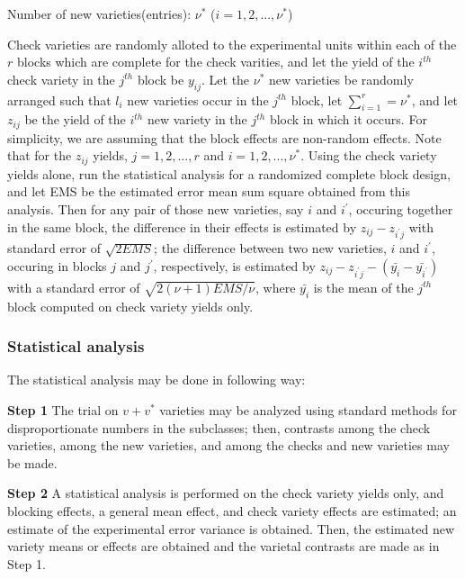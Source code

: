 \documentclass[12pt,oneside]{dukestatscithesis} %
\begin{document}
Number of new varieties(entries): \(\nu^*\) (\(i = 1, 2,..., \nu^*\))

Check varieties are randomly alloted to the experimental units within each of the \(r\) blocks which are complete for the check varities, and let the yield of the \(i^{th}\) check variety in the \(j^{th}\) block be \(y_{ij}\). Let the \(\nu^*\) new varieties be randomly arranged such that \(l_{i}\) new varieties occur in the \(j^{th}\) block, let \(\sum\limits_{i = 1}^r = \nu^*\), and let \(z_{ij}\) be the yield of the \(i^{th}\) new variety in the \(j^{th}\) block in which it occurs. For simplicity, we are assuming that the block effects are non-random effects. Note that for the \(z_{ij}\) yields, \(j = 1, 2, ..., r\) and \(i = 1, 2,..., \nu^*\). Using the check variety yields alone, run the statistical analysis for a randomized complete block design, and let EMS be the estimated error mean sum square obtained from this analysis. Then for any pair of those new varieties, say \(i\) and \(i^{\prime}\), occuring together in the same block, the difference in their effects is estimated by \(z_{ij}- z_{i^{\prime}j}\) with standard error of \(\sqrt{2EMS}\); the difference between two new varieties, \(i\) and \(i^\prime\), occuring in blocks \(j\) and \(j^\prime\), respectively, is estimated by \(z_{ij}-z_{i^{\prime}j}-(\bar{y_{i}}-\bar{y_{i^{\prime}}})\) with a standard error of \(\sqrt{2(\nu + 1)EMS/\nu}\), where \(\bar{y_{i}}\) is the mean of the \(j^{th}\) block computed on check variety yields only.

\hypertarget{stat-an-aug-block}{%
\subsubsection{Statistical analysis}\label{stat-an-aug-block}}

The statistical analysis may be done in following way:

\textbf{Step 1}
\newline The trial on \(v + v^*\) varieties may be analyzed using standard methods for disproportionate numbers in the subclasses; then, contrasts among the check varieties, among the new varieties, and among the checks and new varieties may be made.

\textbf{Step 2}
\newline A statistical analysis is performed on the check variety yields only, and blocking effects, a general mean effect, and check variety effects are estimated; an estimate of the experimental error variance is obtained. Then, the estimated new variety means or effects are obtained and the varietal contrasts are made as in Step 1.
\end{document}
